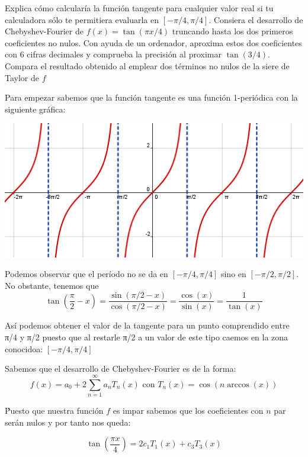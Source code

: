 \begin{problem}[11]
Explica cómo calcularía la función tangente para cualquier valor real si tu calculadora sólo te permitiera evaluarla en $[-π/4,π/4]$. Consiera el desarrollo de Chebyshev-Fourier de $f(x)=\tan(πx/4)$ truncando hasta los dos primeros coeficientes no nulos. Con ayuda de un ordenador, aproxima estos dos coeficientes con 6 cifras decimales y comprueba la precisión al proximar $\tan (3/4)$. Compara el resultado obtenido al emplear dos términos no nulos de la siere de Taylor de $f$
\solution

Para empezar sabemos que la función tangente es una función 1-periódica con la siguiente gráfica:

\begin{center}
	\includegraphics{img/grafica_tangente.png}
\end{center}

Podemos observar que el período no se da en $[-π/4,π/4]$ sino en $[-π/2,π/2]$. No obstante, tenemos que
\[\tan\left(\frac{π}{2}-x\right)=\frac{\sin(π/2-x)}{\cos(π/2-x)}=\frac{\cos(x)}{\sin(x)}=\frac{1}{\tan(x)}\]

Así podemos obtener el valor de la tangente para un punto comprendido entre π/4 y π/2 puesto que al restarle π/2 a un valor de este tipo caemos en la zona conocidoa: $[-π/4,π/4]$

Sabemos que el desarrollo de Chebyshev-Fourier es de la forma:
\[f(x)=a_0+2\sum_{n=1}^{\infty}a_nT_n(x) \text{ con } T_n(x)=\cos(n \arccos(x))\]

Ṕuesto que nuestra función $f$ es impar sabemos que los coeficientes con $n$ par serán nulos y por tanto nos queda:

\[\tan\left(\frac{πx}{4}\right) = 2c_1T_1(x)+c_3T_3(x)\]

\end{problem}

